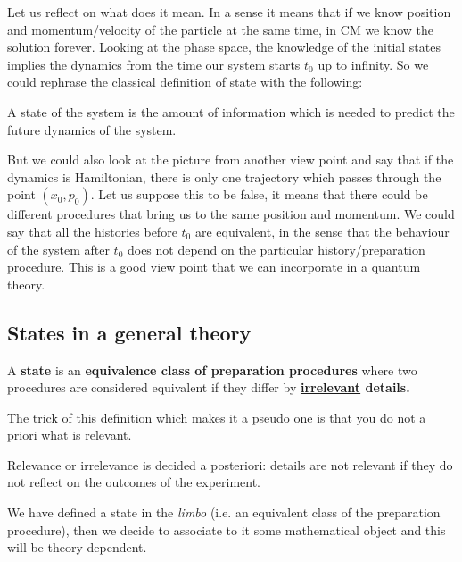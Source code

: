 \documentclass[../main.tex]{subfiles}
\begin{document}
Let us reflect on what does it mean. In a sense it means that if we know position and momentum/velocity of the particle at the same time, in CM we know the solution forever. Looking at the phase space, the knowledge of the initial states implies the dynamics from the time our system starts $t_0$ up to infinity. So we could rephrase the classical definition of state with the following:
\begin{definition}
A state of the system is the amount of information which is needed to predict the future dynamics of the system.
\end{definition}
But we could also look at the picture from another view point and say that if the dynamics is Hamiltonian, there is only one trajectory which passes through the point $(x_0,p_0)$. Let us suppose this to be false, it means that there could be different procedures that bring us to the same position and momentum. We could say that all the histories before $t_0$ are equivalent, in the sense that the behaviour of the system after $t_0$ does not depend on the particular history/preparation procedure. This is a good view point that we can incorporate in a quantum theory.

\subsection{States in a general theory}
\begin{definition}
A \textbf{state} is an \textbf{equivalence class of preparation procedures} where two procedures are considered  equivalent if they differ by \textbf{\underline{irrelevant} details.}
\end{definition}
The trick of this definition which makes it a pseudo one is that you do not a priori what is relevant.
\begin{kaobox}[frametitle=Remark]
Relevance or irrelevance is decided a posteriori: details are not relevant if they do not reflect on the outcomes of the experiment.
\end{kaobox}
We have defined a state in the \textit{limbo} (i.e. an equivalent class of the preparation procedure), then we decide to associate to it some mathematical object and this will be theory dependent.
\end{document}
